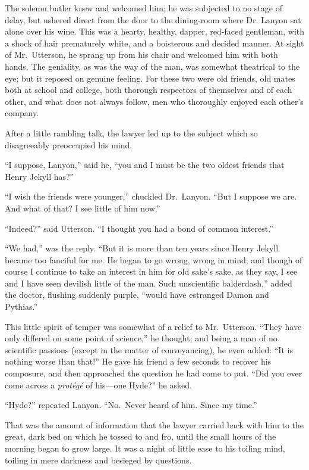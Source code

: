 \documentclass[12pt,openright]{book}
\begin{document}
The solemn butler knew and welcomed him; he was subjected to no stage of delay, but ushered direct from the door to the dining-room where Dr. Lanyon sat alone over his wine. This was a hearty, healthy, dapper, red-faced gentleman, with a shock of hair prematurely white, and a boisterous and decided manner. At sight of Mr. Utterson, he sprang up from his chair and welcomed him with both hands. The geniality, as was the way of the man, was somewhat theatrical to the eye; but it reposed on genuine feeling. For these two were old friends, old mates both at school and college, both thorough respectors of themselves and of each other, and what does not always follow, men who thoroughly enjoyed each other’s company.

After a little rambling talk, the lawyer led up to the subject which so disagreeably preoccupied his mind.

“I suppose, Lanyon,” said he, “you and I must be the two oldest friends that Henry Jekyll has?”

“I wish the friends were younger,” chuckled Dr. Lanyon. “But I suppose we are. And what of that? I see little of him now.”

“Indeed?” said Utterson. “I thought you had a bond of common interest.”

“We had,” was the reply. “But it is more than ten years since Henry Jekyll became too fanciful for me. He began to go wrong, wrong in mind; and though of course I continue to take an interest in him for old sake’s sake, as they say, I see and I have seen devilish little of the man. Such unscientific balderdash,” added the doctor, flushing suddenly purple, “would have estranged Damon and Pythias.”

This little spirit of temper was somewhat of a relief to Mr. Utterson. “They have only differed on some point of science,” he thought; and being a man of no scientific passions (except in the matter of conveyancing), he even added: “It is nothing worse than that!” He gave his friend a few seconds to recover his composure, and then approached the question he had come to put. “Did you ever come across a \textit{protégé} of his—one Hyde?” he asked.

“Hyde?” repeated Lanyon. “No. Never heard of him. Since my time.”

That was the amount of information that the lawyer carried back with him to the great, dark bed on which he tossed to and fro, until the small hours of the morning began to grow large. It was a night of little ease to his toiling mind, toiling in mere darkness and besieged by questions.
\end{document}
